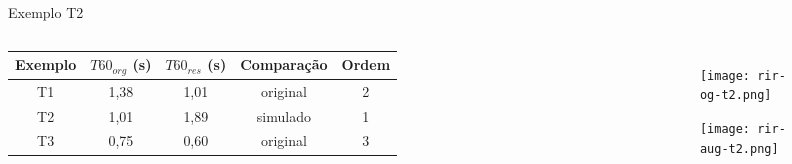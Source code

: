 \begin{frame}{Exemplo T2}
    \begin{columns}
        \begin{table} [H]
            \begin{adjustbox}{width=\columnwidth,center}
                \begin{tabular}{c|c|c|c|c}
            
                    \textbf{Exemplo} & 
                    \textbf{$T60_{org}$ (s)} & 
                    \textbf{$T60_{res}$ (s)} & 
                    \textbf{Comparação} &
                    \textbf{Ordem} \\
                    \hline 
            
                    T1 & 1,38 & 1,01 & original & 2 \\
                    T2 & 1,01 & 1,89 & simulado & 1 \\
                    T3 & 0,75 & 0,60 & original & 3 \\
            
                \end{tabular}
            \end{adjustbox}
        \end{table}

        \begin{figure}
            \begin{subfigure}{\textwidth}
                \centering
                \texttt{[image: rir-og-t2.png]}
            \end{subfigure}
            \begin{subfigure}{\textwidth}
                \centering
                \texttt{[image: rir-aug-t2.png]}
            \end{subfigure}
        \end{figure}
    \end{columns}
        
\end{frame}

